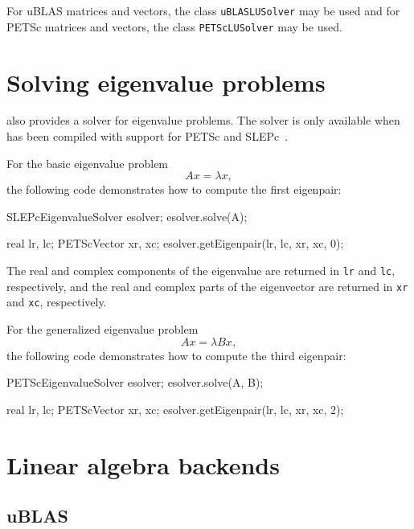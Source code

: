 For uBLAS matrices and vectors, the class \texttt{uBLASLUSolver} may
be used and for PETSc matrices and vectors, the class
\texttt{PETScLUSolver} may be used.

\section{Solving eigenvalue problems}

\dolfin{} also provides a solver for eigenvalue problems. 
The solver is only available when \dolfin{} has been compiled with support for 
PETSc and SLEPc~\cite{www:slepc}.

For the basic eigenvalue problem
%
\begin{equation}
  Ax = \lambda x,
\end{equation}
%
the following code demonstrates how to compute the first eigenpair:
%
\begin{code} 
SLEPcEigenvalueSolver esolver; 
esolver.solve(A);

real lr, lc;
PETScVector xr, xc;
esolver.getEigenpair(lr, lc, xr, xc, 0);
\end{code} 
%
The real and complex components of the eigenvalue are returned in \texttt{lr}
and \texttt{lc}, respectively, and the real and complex parts of the eigenvector
are returned in \texttt{xr} and \texttt{xc}, respectively.

For the generalized eigenvalue problem
\begin{equation}
 A x = \lambda B x,
\end{equation}
the following code demonstrates how to compute the third eigenpair:
\begin{code} 
PETScEigenvalueSolver esolver; 
esolver.solve(A, B);

real lr, lc;
PETScVector xr, xc;
esolver.getEigenpair(lr, lc, xr, xc, 2);
\end{code} 
\section{Linear algebra backends}

\subsection{uBLAS}

